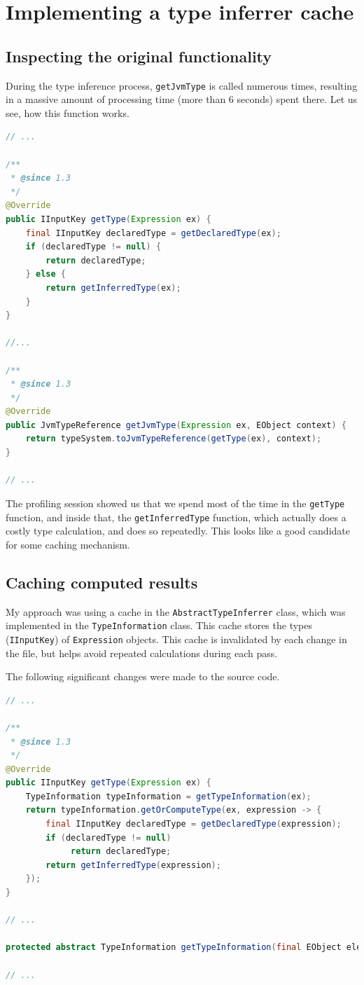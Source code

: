 \documentclass[11pt,a4paper,oneside]{report}
\begin{document}
\section{Implementing a type inferrer cache}
\subsection{Inspecting the original functionality}
During the type inference process, \texttt{getJvmType} is called numerous times,
resulting in a massive amount of processing time (more than 6 seconds) spent
there. Let us see, how this function works.

\begin{lstlisting}[caption={Original source code of \texttt{getType}}, language=java]
// ...

/**
 * @since 1.3
 */
@Override
public IInputKey getType(Expression ex) {
    final IInputKey declaredType = getDeclaredType(ex);
    if (declaredType != null) {
        return declaredType;
    } else {
        return getInferredType(ex);
    }
}

//...

/**
 * @since 1.3
 */
@Override
public JvmTypeReference getJvmType(Expression ex, EObject context) {
    return typeSystem.toJvmTypeReference(getType(ex), context);
}

// ...
\end{lstlisting}

The profiling session showed us that we spend most of the time in the
\texttt{getType} function, and inside that, the \texttt{getInferredType}
function, which actually does a costly type calculation, and does so repeatedly.
This looks like a good candidate for some caching mechanism.

\subsection{Caching computed results}
My approach was using a cache in the \texttt{AbstractTypeInferrer} class,
which was implemented in the \texttt{TypeInformation} class. This cache
stores the types (\texttt{IInputKey}) of \texttt{Expression} objects. This
cache is invalidated by each change in the file, but helps avoid repeated
calculations during each pass.

The following significant changes were made to the source code.

\begin{lstlisting}[caption={AbstractTypeInferrer.java}, language=java]
// ...

/**
 * @since 1.3
 */
@Override
public IInputKey getType(Expression ex) {
    TypeInformation typeInformation = getTypeInformation(ex);
    return typeInformation.getOrComputeType(ex, expression -> {
        final IInputKey declaredType = getDeclaredType(expression);
        if (declaredType != null)
             return declaredType;
        return getInferredType(expression);
    });
}

// ...

protected abstract TypeInformation getTypeInformation(final EObject element);

// ...
\end{lstlisting}
\end{document}
